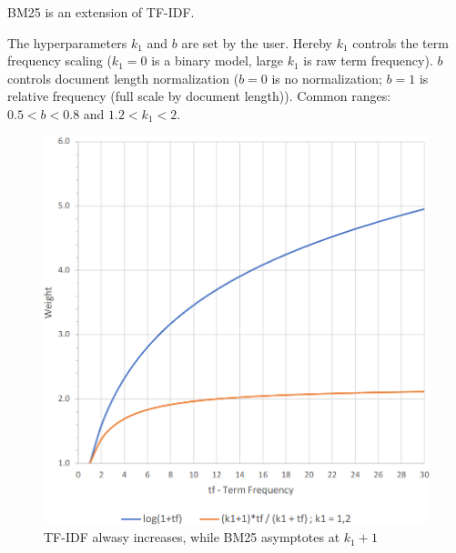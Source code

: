 \documentclass[
../../NLP4W_Summary.tex,
]
{subfiles}
\begin{document}
\begin{defbox}
    [BM25]
    BM25 is an extension of TF-IDF. 

    \begin{center}
        \begin{smallmathbox*}
        \end{smallmathbox*}
    \end{center}
    The hyperparameters $k_1$ and $b$ are set by the user. Hereby $k_1$ controls the term frequency scaling ($k_1 = 0$ is a binary model, large $k_1$ is raw term frequency).
    $b$ controls document length normalization ($b = 0$ is no normalization; $b = 1$ is relative frequency (full scale by document length)).
    Common ranges: $0.5 < b < 0.8$ and $1.2 < k_1 < 2$.
\end{defbox}

\begin{figure}
    [htp]
    \centering
    \includegraphics[scale=0.35]{Pics/TFIDFVSBM25.png}
    \caption{TF-IDF alwasy increases, while BM25 asymptotes at $k_1 + 1$}
\end{figure}
\end{document}
